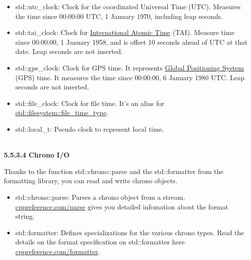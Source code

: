 \begin{itemize}
\item 
std::utc\_clock: Clock for the coordinated Universal Time (UTC). Measures the time since 00:00:00 UTC, 1 January 1970, including leap seconds.

\item 
std::tai\_clock: Clock for \href{https://en.wikipedia.org/wiki/International_Atomic_Time}{International Atomic Time} (TAI). Measure time since 00:00:00, 1 January 1958, and is offset 10 seconds ahead of UTC at that date. Leap seconds are not inserted.

\item 
std::gps\_clock: Clock for GPS time. It represents \href{https://en.wikipedia.org/wiki/Global_Positioning_System}{Global Positioning System} (GPS) time. It measures the time since 00:00:00, 6 January 1980 UTC. Leap seconds are not inserted.

\item 
std::file\_clock: Clock for file time. It’s an alias for \href{https://en.cppreference.com/w/cpp/filesystem/file_time_type}{std::filesystem::file\_time\_type}.

\item 
std::local\_t: Pseudo clock to represent local time.
\end{itemize}


\hspace*{\fill} \\ %
\noindent
\textbf{5.5.3.4\hspace{0.2cm} Chrono I/O}

Thanks to the function std::chrono::parse and the std::formatter from the formatting library, you can read and write chrono objects.

\begin{itemize}
\item 
std::chrono::parse: Parses a chrono object from a stream. \href{https://en.cppreference.com/w/cpp/chrono/parse}{cppreference.com/parse} gives you detailed infomation about the format string.

\item 
std::formatter: Defines specializations for the various chrono types. Read the details on the format specification on std::formatter here \href{https://en.cppreference.com/w/cpp/chrono/system_clock/formatter#Format_specification}{cppreference.com/formatter}.
\end{itemize}

